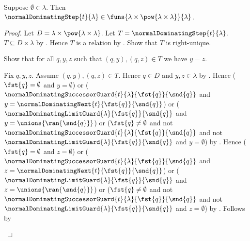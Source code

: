 \begin{theorem}\label{normal_dominating_step_type}
    Suppose $\emptyset\in\lambda$.
    Then $\normalDominatingStep{t}{\lambda}
        \in\funs{\lambda\times\pow{\lambda\times\lambda}}{\lambda}$.
\end{theorem}
\begin{proof}
    Let $D=\lambda\times\pow{\lambda\times\lambda}$.
    Let $T=\normalDominatingStep{t}{\lambda}$.
    $T\subseteq D\times\lambda$ by
        .
    Hence $T$ is a relation by
        .
    Show that $T$ is right-unique.
    \begin{subproof}
        Show that for all $q,y,z$ such that $(q,y),(q,z)\in T$
            we have $y=z$.
        \begin{subproof}
            Fix $q,y,z$.
            Assume $(q,y),(q,z)\in T$.
            Hence $q\in D$ and $y,z\in\lambda$ by
                .
            Hence
                ($\fst{q}=\emptyset$ and $y=\emptyset$) or
                ($\normalDominatingSuccessorGuard{t}{\lambda}
                    {\fst{q}}{\snd{q}}$ and
                    $y=\normalDominatingNext{t}{\fst{q}}{\snd{q}}$) or
                ($\normalDominatingLimitGuard{\lambda}
                    {\fst{q}}{\snd{q}}$ and
                    $y=\unions{\ran{\snd{q}}}$) or
                ($\fst{q}\neq\emptyset$ and
                    not $\normalDominatingSuccessorGuard{t}{\lambda}
                        {\fst{q}}{\snd{q}}$ and
                    not $\normalDominatingLimitGuard{\lambda}
                        {\fst{q}}{\snd{q}}$ and
                    $y=\emptyset$) by
                .
            Hence
                ($\fst{q}=\emptyset$ and $z=\emptyset$) or
                ($\normalDominatingSuccessorGuard{t}{\lambda}
                    {\fst{q}}{\snd{q}}$ and
                    $z=\normalDominatingNext{t}{\fst{q}}{\snd{q}}$) or
                ($\normalDominatingLimitGuard{\lambda}
                    {\fst{q}}{\snd{q}}$ and
                    $z=\unions{\ran{\snd{q}}}$) or
                ($\fst{q}\neq\emptyset$ and
                    not $\normalDominatingSuccessorGuard{t}{\lambda}
                        {\fst{q}}{\snd{q}}$ and
                    not $\normalDominatingLimitGuard{\lambda}
                        {\fst{q}}{\snd{q}}$ and
                    $z=\emptyset$) by
                .
            Follows by
\end{subproof}
\end{subproof}
\end{proof}
